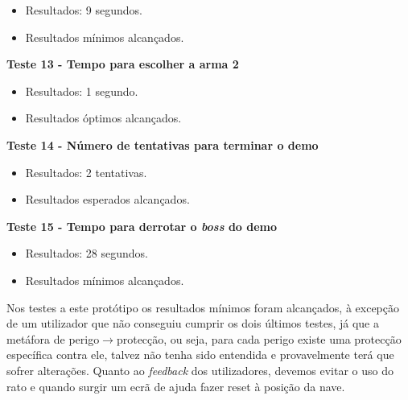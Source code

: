 \begin{itemize}

\item Resultados: 9 segundos.

\item Resultados mínimos alcançados.
\end{itemize}

\textbf{Teste 13 - Tempo para escolher a arma 2}

\begin{itemize}

\item Resultados: 1 segundo.

\item Resultados óptimos alcançados.
\end{itemize}

\textbf{Teste 14 - Número de tentativas para terminar o demo}

\begin{itemize}

\item Resultados: 2 tentativas.

\item Resultados esperados alcançados.
\end{itemize}

\textbf{Teste 15 - Tempo para derrotar o \textit{boss} do demo}

\begin{itemize}

\item Resultados: 28 segundos.

\item Resultados mínimos alcançados.
\end{itemize}

Nos testes a este protótipo os resultados mínimos foram alcançados, à excepção de um utilizador que não conseguiu cumprir os dois últimos testes, já que a metáfora de perigo$\rightarrow$protecção, ou seja, para cada perigo existe uma protecção específica contra ele, talvez não tenha sido entendida e provavelmente terá que sofrer alterações. Quanto ao \textit{feedback} dos utilizadores, devemos evitar o uso do rato e quando surgir um ecrã de ajuda fazer reset à posição da nave.